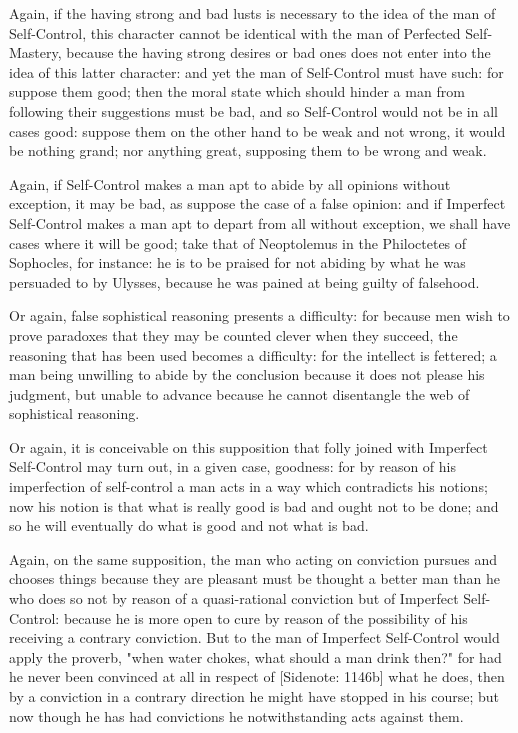 Again, if the having strong and bad lusts is necessary to the idea of
the man of Self-Control, this character cannot be identical with the man
of Perfected Self-Mastery, because the having strong desires or bad ones
does not enter into the idea of this latter character: and yet the man
of Self-Control must have such: for suppose them good; then the moral
state which should hinder a man from following their suggestions must be
bad, and so Self-Control would not be in all cases good: suppose them on
the other hand to be weak and not wrong, it would be nothing grand; nor
anything great, supposing them to be wrong and weak.

Again, if Self-Control makes a man apt to abide by all opinions without
exception, it may be bad, as suppose the case of a false opinion: and
if Imperfect Self-Control makes a man apt to depart from all without
exception, we shall have cases where it will be good; take that of
Neoptolemus in the Philoctetes of Sophocles, for instance: he is to be
praised for not abiding by what he was persuaded to by Ulysses, because
he was pained at being guilty of falsehood.

Or again, false sophistical reasoning presents a difficulty: for because
men wish to prove paradoxes that they may be counted clever when they
succeed, the reasoning that has been used becomes a difficulty: for the
intellect is fettered; a man being unwilling to abide by the conclusion
because it does not please his judgment, but unable to advance because
he cannot disentangle the web of sophistical reasoning.

Or again, it is conceivable on this supposition that folly joined with
Imperfect Self-Control may turn out, in a given case, goodness: for by
reason of his imperfection of self-control a man acts in a way which
contradicts his notions; now his notion is that what is really good is
bad and ought not to be done; and so he will eventually do what is good
and not what is bad.

Again, on the same supposition, the man who acting on conviction pursues
and chooses things because they are pleasant must be thought a better
man than he who does so not by reason of a quasi-rational conviction but
of Imperfect Self-Control: because he is more open to cure by reason of
the possibility of his receiving a contrary conviction. But to the man
of Imperfect Self-Control would apply the proverb, "when water chokes,
what should a man drink then?" for had he never been convinced at all
in respect of [Sidenote: 1146b] what he does, then by a conviction in a
contrary direction he might have stopped in his course; but now though
he has had convictions he notwithstanding acts against them.

